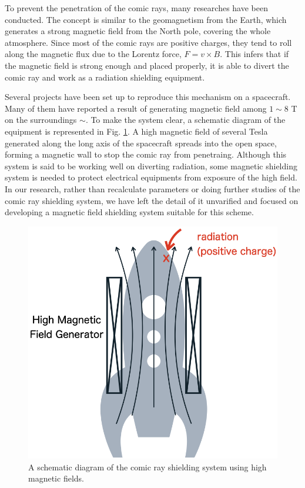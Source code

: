 To prevent the penetration of the comic rays, many researches have been conducted.
The concept is similar to the geomagnetism from the Earth,
which generates a strong magnetic field from the North pole, covering the whole atmosphere.
Since most of the comic rays are positive charges, they tend to roll along the magnetic flux due to the Lorentz force, $F = v\times B$.
This infers that if the magnetic field is strong enough and placed properly,
it is able to divert the comic ray and work as a radiation shielding equipment.

Several projects have been set up to reproduce this mechanism on a spacecraft.
Many of them have reported a result of generating magnetic field among $1\sim8$ T on the surroundings \cite{1_1_2}$\sim$\cite{1_1_5}.
To make the system clear, a schematic diagram of the equipment is represented in Fig. \ref{fig:SR2SwithoutShielding}.
A high magnetic field of several Tesla generated along the long axis of the spacecraft spreads into the open space,
forming a magnetic wall to stop the comic ray from penetraing.
Although this system is said to be working well on diverting radiation, some magnetic shielding system is needed to protect electrical equipments from exposure of the high field.
In our research, rather than recalculate parameters or doing further studies of the comic ray shielding system,
we have left the detail of it unvarified and focused on developing a magnetic field shielding system suitable for this scheme.
\begin{figure}[H]
  \includegraphics[width=18cm, bb=9 9 900 900]{./section1Introduction/SR2SwithoutShielding.png}
  \caption{A schematic diagram of the  comic ray shielding system using high magnetic fields. }
  \label{fig:SR2SwithoutShielding}
\end{figure}


